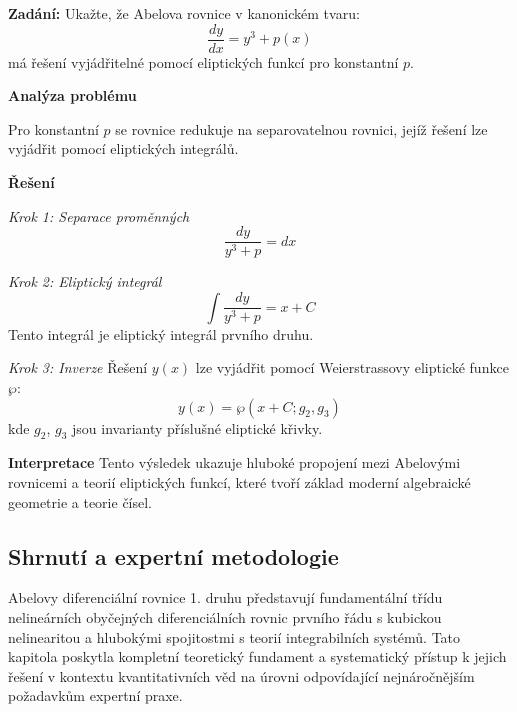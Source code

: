 \begin{example}
\label{ex:elipticke-funkce}

\noindent\textbf{Zadání:} Ukažte, že Abelova rovnice v kanonickém tvaru:
\[
\frac{dy}{dx} = y^3 + p(x)
\]
má řešení vyjádřitelné pomocí eliptických funkcí pro konstantní $p$.

\vspace{1.5\baselineskip}

\noindent\textbf{Analýza problému}

Pro konstantní $p$ se rovnice redukuje na separovatelnou rovnici, jejíž řešení lze vyjádřit pomocí eliptických integrálů.

\vspace{1.5\baselineskip}

\noindent\textbf{Řešení}

\noindent\textit{Krok 1: Separace proměnných}
\[
\frac{dy}{y^3 + p} = dx
\]

\vspace{1\baselineskip}

\noindent\textit{Krok 2: Eliptický integrál}
\[
\int \frac{dy}{y^3 + p} = x + C
\]
Tento integrál je eliptický integrál prvního druhu.

\vspace{1\baselineskip}

\noindent\textit{Krok 3: Inverze}
Řešení $y(x)$ lze vyjádřit pomocí Weierstrassovy eliptické funkce $\wp$:
\[
y(x) = \wp(x + C; g_2, g_3)
\]
kde $g_2$, $g_3$ jsou invarianty příslušné eliptické křivky.

\vspace{1.5\baselineskip}

\noindent\textbf{Interpretace}
Tento výsledek ukazuje hluboké propojení mezi Abelovými rovnicemi a teorií eliptických funkcí, které tvoří základ moderní algebraické geometrie a teorie čísel.

\end{example}

\subsection{Shrnutí a expertní metodologie}
\label{subsec:shrnuti-abel}

Abelovy diferenciální rovnice 1. druhu představují fundamentální třídu nelineárních obyčejných diferenciálních rovnic prvního řádu s kubickou nelinearitou a hlubokými spojitostmi s teorií integrabilních systémů. Tato kapitola poskytla kompletní teoretický fundament a systematický přístup k jejich řešení v kontextu kvantitativních věd na úrovni odpovídající nejnáročnějším požadavkům expertní praxe.

